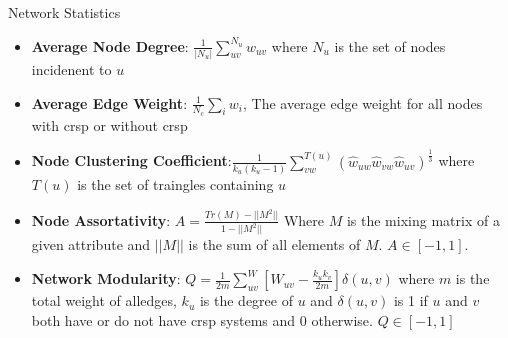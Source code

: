 \documentclass[dvipsnames]{beamer}
\begin{document}
\begin{frame}[fragile]{Network Statistics}
    \begin{itemize}
        \item<2-> \textbf{Average Node Degree}: $\frac{1}{|N_u|}\sum_{uv}^{N_u} w_{uv}$ where $N_u$ is the set of nodes incidenent to $u$
        \item<3-> \textbf{Average Edge Weight}: $\frac{1}{N_c}\sum_i w_i$, The average edge weight for all nodes with \ac{crsp} or without \ac{crsp}
        \item<4-> \textbf{Node Clustering Coefficient}:$\frac{1}{k_u(k_u-1)} \sum_{vw}^{T(u)} (\hat{w}_{uw} \hat{w}_{vw} \hat{w}_{uv})^{\frac{1}{3}}$ where $T(u)$ is the set of traingles containing $u$ \autocite{clustering}
        \item<5-> \textbf{Node Assortativity}: $A = \frac{Tr(M)-||M^2||}{1-||M^2||}$ Where $M$ is the mixing matrix of a given attribute and $||M||$ is the sum of all elements of $M$. $A \in [-1,1]$.\autocite{newmanmix}
        \item<6-> \textbf{Network Modularity}: $Q=\frac{1}{2m}\sum_{uv}^W [W_{uv} - \frac{k_u k_v}{2m}]\delta(u,v)$ where $m$ is the total weight of alledges, $k_u$ is the degree of $u$ and $\delta(u,v)$ is 1 if $u$ and $v$ both have or do not have \ac{crsp} systems and 0 otherwise. $Q \in [-1,1]$ \autocite{modularity}
    \end{itemize}
\end{frame}
\end{document}

